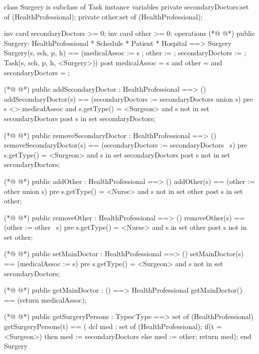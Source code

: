 \begin{vdmpp}[breaklines=true]
class Surgery is subclass of Task
instance variables
  private secondaryDoctors:set of (HealthProfessional);
  private other:set of (HealthProfessional);
  
  inv card secondaryDoctors >= 0;
  inv card other >= 0;
operations
(*@
\label{Surgery:9}
@*)
 public Surgery: HealthProfessional * Schedule * Patient * Hospital ==> Surgery
  Surgery(s, sch, p, h) == (medicalAssoc := s ; other := {}; secondaryDoctors := {}; Task(s, sch, p, h, <Surgery>))
 post medicalAssoc = s and other = {} and secondaryDoctors = {};
 
(*@
\label{addSecondaryDoctor:13}
@*)
 public addSecondaryDoctor : HealthProfessional ==> ()
  addSecondaryDoctor(s) == (secondaryDoctors := secondaryDoctors union {s})
 pre s <> medicalAssoc and s.getType() = <Surgeon> and  s not in set secondaryDoctors
 post s in set secondaryDoctors;
  
(*@
\label{removeSecondaryDoctor:18}
@*)
 public removeSecondaryDoctor : HealthProfessional ==> ()
  removeSecondaryDoctor(s) == (secondaryDoctors := secondaryDoctors \ {s})
 pre s.getType() = <Surgeon> and s in set secondaryDoctors
 post s not in set secondaryDoctors;
  
(*@
\label{addOther:23}
@*)
 public addOther : HealthProfessional ==> ()
  addOther(s) == (other := other union {s})
 pre s.getType() = <Nurse> and s not in set other
 post s in set other;
  
(*@
\label{removeOther:28}
@*)
 public removeOther : HealthProfessional ==> ()
  removeOther(s) == (other := other \ {s})
 pre s.getType() = <Nurse> and s in set other
 post s not in set other;
  
(*@
\label{setMainDoctor:33}
@*)
 public setMainDoctor : HealthProfessional ==> ()
  setMainDoctor(s) == (medicalAssoc := s)
 pre s.getType() = <Surgeon> and s not in set secondaryDoctors;
 
(*@
\label{getMainDoctor:37}
@*)
 public getMainDoctor : () ==> HealthProfessional
  getMainDoctor() == (return medicalAssoc);

(*@
\label{getSurgeryPersons:40}
@*)
 public getSurgeryPersons : Types`Type ==> set of (HealthProfessional)
  getSurgeryPersons(t) == (
               dcl med : set of (HealthProfessional);
               if(t = <Surgeon>)
                then med := secondaryDoctors
               else
                med := other;
               return med);
end Surgery
\end{vdmpp}
\bigskip
